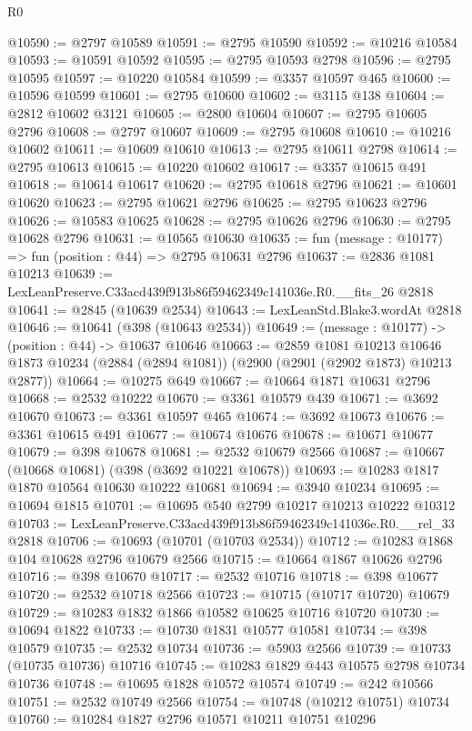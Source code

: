 \begin{lexlean}{R0}
\begin{coremodule}
@10590 := @2797 @10589
@10591 := @2795 @10590
@10592 := @10216 @10584
@10593 := @10591 @10592
@10595 := @2795 @10593 @2798
@10596 := @2795 @10595
@10597 := @10220 @10584
@10599 := @3357 @10597 @465
@10600 := @10596 @10599
@10601 := @2795 @10600
@10602 := @3115 @138
@10604 := @2812 @10602 @3121
@10605 := @2800 @10604
@10607 := @2795 @10605 @2796
@10608 := @2797 @10607
@10609 := @2795 @10608
@10610 := @10216 @10602
@10611 := @10609 @10610
@10613 := @2795 @10611 @2798
@10614 := @2795 @10613
@10615 := @10220 @10602
@10617 := @3357 @10615 @491
@10618 := @10614 @10617
@10620 := @2795 @10618 @2796
@10621 := @10601 @10620
@10623 := @2795 @10621 @2796
@10625 := @2795 @10623 @2796
@10626 := @10583 @10625
@10628 := @2795 @10626 @2796
@10630 := @2795 @10628 @2796
@10631 := @10565 @10630
@10635 := fun (message : @10177) => fun (position : @44) => @2795 @10631 @2796
@10637 := @2836 @1081 @10213
@10639 := LexLeanPreserve.C33acd439f913b86f59462349c141036e.R0.__fits_26 @2818
@10641 := @2845 (@10639 @2534)
@10643 := LexLeanStd.Blake3.wordAt @2818
@10646 := @10641 (@398 (@10643 @2534))
@10649 := (message : @10177) -> (position : @44) -> @10637 @10646
@10663 := @2859
    @1081
    @10213
    @10646
    @1873
    @10234
    (@2884 (@2894 @1081))
    (@2900 (@2901 (@2902 @1873) @10213 @2877))
@10664 := @10275 @649
@10667 := @10664 @1871 @10631 @2796
@10668 := @2532 @10222
@10670 := @3361 @10579 @439
@10671 := @3692 @10670
@10673 := @3361 @10597 @465
@10674 := @3692 @10673
@10676 := @3361 @10615 @491
@10677 := @10674 @10676
@10678 := @10671 @10677
@10679 := @398 @10678
@10681 := @2532 @10679 @2566
@10687 := @10667 (@10668 @10681) (@398 (@3692 @10221 @10678))
@10693 := @10283 @1817 @1870 @10564 @10630 @10222 @10681
@10694 := @3940 @10234
@10695 := @10694 @1815
@10701 := @10695 @540 @2799 @10217 @10213 @10222 @10312
@10703 := LexLeanPreserve.C33acd439f913b86f59462349c141036e.R0.__rel_33 @2818
@10706 := @10693 (@10701 (@10703 @2534))
@10712 := @10283 @1868 @104 @10628 @2796 @10679 @2566
@10715 := @10664 @1867 @10626 @2796
@10716 := @398 @10670
@10717 := @2532 @10716
@10718 := @398 @10677
@10720 := @2532 @10718 @2566
@10723 := @10715 (@10717 @10720) @10679
@10729 := @10283 @1832 @1866 @10582 @10625 @10716 @10720
@10730 := @10694 @1822
@10733 := @10730 @1831 @10577 @10581
@10734 := @398 @10579
@10735 := @2532 @10734
@10736 := @5903 @2566
@10739 := @10733 (@10735 @10736) @10716
@10745 := @10283 @1829 @443 @10575 @2798 @10734 @10736
@10748 := @10695 @1828 @10572 @10574
@10749 := @242 @10566
@10751 := @2532 @10749 @2566
@10754 := @10748 (@10212 @10751) @10734
@10760 := @10284 @1827 @2796 @10571 @10211 @10751 @10296

\end{coremodule}
\end{lexlean}
